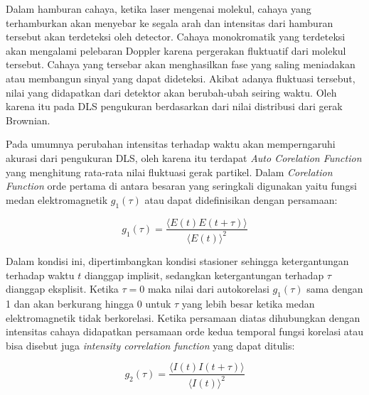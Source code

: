 Dalam hamburan cahaya, ketika laser mengenai molekul, cahaya yang terhamburkan akan menyebar ke
segala arah dan intensitas dari hamburan tersebut akan terdeteksi oleh detector. Cahaya monokromatik
yang terdeteksi akan mengalami pelebaran Doppler karena pergerakan fluktuatif dari molekul tersebut.
Cahaya yang tersebar akan menghasilkan fase yang saling meniadakan atau membangun sinyal yang dapat
dideteksi. Akibat adanya fluktuasi tersebut, nilai yang didapatkan dari detektor akan berubah-ubah
seiring waktu. Oleh karena itu pada DLS pengukuran berdasarkan dari nilai distribusi dari gerak
Brownian\cite{Falke2019,PavanM.V.Raja2022}. 

Pada umumnya perubahan intensitas terhadap waktu akan memperngaruhi akurasi dari pengukuran DLS,
oleh karena itu terdapat \textit{Auto Corelation Function} yang menghitung rata-rata nilai
fluktuasi gerak partikel. Dalam \textit{Corelation Function} orde pertama di antara besaran
yang seringkali digunakan yaitu fungsi medan elektromagnetik ${g_1 (\tau)}$ atau dapat
didefinisikan dengan persamaan:

\begin{equation}
    g_1 (\tau) = \frac{\langle E(t) E(t+\tau)\rangle}{\langle E(t)\rangle^2}
\end{equation}

Dalam kondisi ini, dipertimbangkan kondisi stasioner sehingga ketergantungan terhadap waktu
${t}$ dianggap implisit, sedangkan ketergantungan terhadap ${\tau}$ dianggap eksplisit.
Ketika ${\tau = 0}$ maka nilai dari autokorelasi ${g_1(\tau)}$ sama dengan 1 dan akan
berkurang hingga 0 untuk ${\tau}$ yang lebih besar ketika medan elektromagnetik tidak
berkorelasi. Ketika persamaan diatas dihubungkan dengan intensitas cahaya didapatkan
persamaan orde kedua temporal fungsi korelasi atau bisa disebut juga \textit{intensity
correlation function} yang dapat ditulis:

\begin{equation}
    g_2 (\tau) = \frac{\langle I(t) I(t+\tau)\rangle}{\langle I(t)\rangle^2}
    \label{eq:g_2}
\end{equation}

